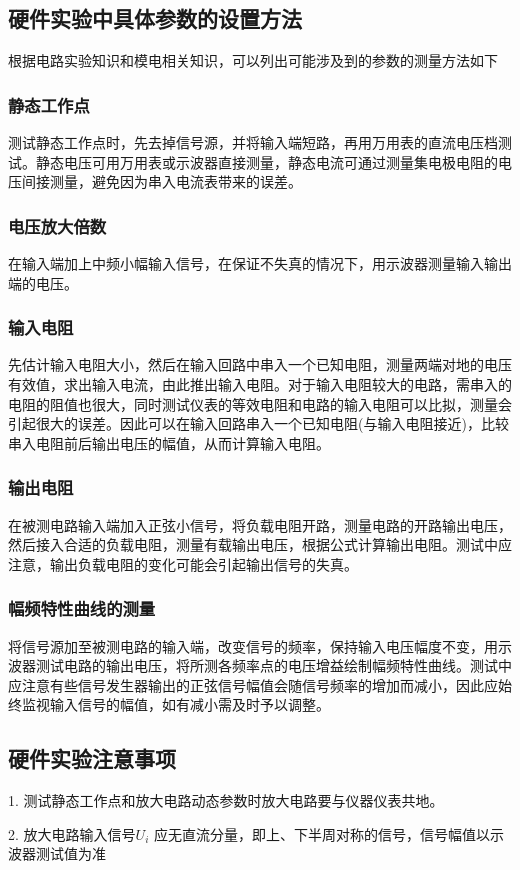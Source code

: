 \documentclass[UTF8,a4paper]{ctexart}
\begin{document}
\subsection{硬件实验中具体参数的设置方法}
根据电路实验知识和模电相关知识，可以列出可能涉及到的参数的测量方法如下
\subsubsection{静态工作点}
测试静态工作点时，先去掉信号源，并将输入端短路，再用万用表的直流电压档测试。静态电压可用万用表或示波器直接测量，静态电流可通过测量集电极电阻的电压间接测量，避免因为串入电流表带来的误差。
\subsubsection{电压放大倍数}
在输入端加上中频小幅输入信号，在保证不失真的情况下，用示波器测量输入输出端的电压。
\subsubsection{输入电阻}
先估计输入电阻大小，然后在输入回路中串入一个已知电阻，测量两端对地的电压有效值，求出输入电流，由此推出输入电阻。对于输入电阻较大的电路，需串入的电阻的阻值也很大，同时测试仪表的等效电阻和电路的输入电阻可以比拟，测量会引起很大的误差。因此可以在输入回路串入一个已知电阻(与输入电阻接近)，比较串入电阻前后输出电压的幅值，从而计算输入电阻。
\subsubsection{输出电阻}
在被测电路输入端加入正弦小信号，将负载电阻开路，测量电路的开路输出电压，然后接入合适的负载电阻，测量有载输出电压，根据公式计算输出电阻。测试中应注意，输出负载电阻的变化可能会引起输出信号的失真。
\subsubsection{幅频特性曲线的测量}
将信号源加至被测电路的输入端，改变信号的频率，保持输入电压幅度不变，用示波器测试电路的输出电压，将所测各频率点的电压增益绘制幅频特性曲线。测试中应注意有些信号发生器输出的正弦信号幅值会随信号频率的增加而减小，因此应始终监视输入信号的幅值，如有减小需及时予以调整。
\subsection{硬件实验注意事项}
1. 测试静态工作点和放大电路动态参数时放大电路要与仪器仪表共地。

2. 放大电路输入信号$U_i$ 应无直流分量，即上、下半周对称的信号，信号幅值以示波器测试值为准
\end{document}
